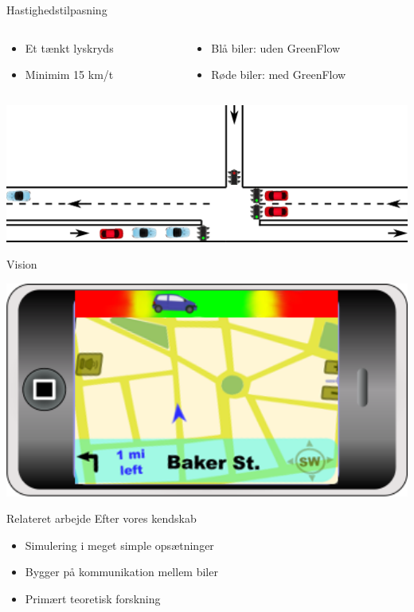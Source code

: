 \begin{frame}{Hastighedstilpasning}
\begin{columns}
\begin{column}{0.4\textwidth}
\begin{itemize}
\item Et tænkt lyskryds
\item Minimim 15 km/t
\end{itemize}
\end{column}
\begin{column}{0.6\textwidth}
\begin{itemize}
\item Blå biler: uden GreenFlow
\item Røde biler: med GreenFlow
\end{itemize}
\end{column}
\end{columns}
\vspace{3mm}
\includegraphics[width=1\textwidth]{../images/introNetworkSimple2.png}
\end{frame}

\begin{frame}{Vision}
\begin{center}
\includegraphics[width=1\textwidth]{../images/product.png}
\end{center}
\end{frame}

\begin{frame}{Relateret arbejde}
Efter vores kendskab
\begin{itemize}
\item Simulering i meget simple opsætninger
\item Bygger på kommunikation mellem biler
\item Primært teoretisk forskning
\end{itemize}

\end{frame}

